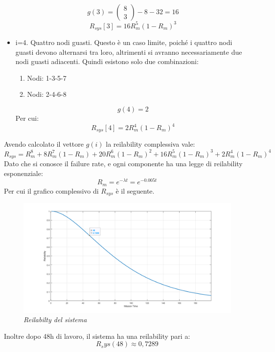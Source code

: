 \begin{itemize}
\begin{enumerate}
	\end{enumerate}
	\begin{equation*}
		g(3) = \begin{pmatrix}
			8 \\ 3
		\end{pmatrix} - 8 - 32 = 16
	\end{equation*}
	\begin{equation*}
		R_{sys}[3] = 16 R_m^5 (1-R_m)^3
	\end{equation*}	
	\item i=4. Quattro nodi guasti. Questo è un caso limite, poiché i quattro nodi guasti devono alternarsi tra loro, altrimenti si avranno necessariamente due nodi guasti adiacenti. Quindi esistono solo due combinazioni:
	\begin{enumerate}
		\item Nodi: 1-3-5-7
		\item Nodi: 2-4-6-8
	\end{enumerate}
	\begin{equation*}
	g(4) = 2
	\end{equation*}
	Per cui:
	\begin{equation*}
		R_{sys}[4] = 2 R_m^4 (1-R_m)^4
	\end{equation*}
\end{itemize}
Avendo calcolato il vettore $g(i)$ la reilability complessiva vale:
\begin{equation*}
	R_{sys} = R_m^8 + 8 R_m^7 (1-R_m) + 20 R_m^6 (1-R_m)^2 + 16 R_m^5 (1-R_m)^3 + 2 R_m^4 (1-R_m)^4
\end{equation*}
Dato che si conosce il failure rate, e ogni componente ha una legge di reilability esponenziale:
\begin{equation*}
	R_m = e^{-\lambda t} = e^{-0.005 t}
\end{equation*}
Per cui il grafico complessivo di $R_{sys}$ è il seguente.
\begin{figure}[H]
	\centering
	\includegraphics[width=\textwidth]{img/hw5/es3_grafico.png}
	\caption{\textit{Reilabilty del sistema}}
\end{figure}
Inoltre dopo 48h di lavoro, il sistema ha una reilability pari a:
\begin{equation*}
	R_sys(48) \approx 0,7289
\end{equation*}

